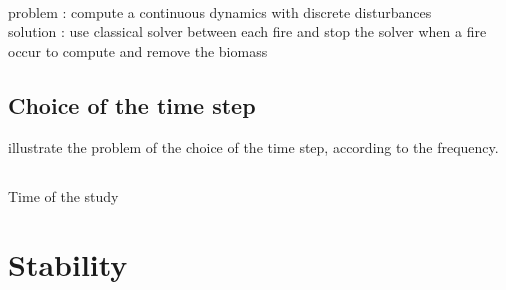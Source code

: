 \documentclass{article}
\begin{document}
\paragraph{}
problem : compute a continuous dynamics with discrete disturbances \\
solution : use classical solver between each fire and stop the solver when a fire occur to compute and remove the biomass


\subsection{Choice of the time step}
illustrate the problem of the choice of the time step, according to the frequency.

\subsection{}
Time of the study



\newpage
\section{Stability}

\end{document}
